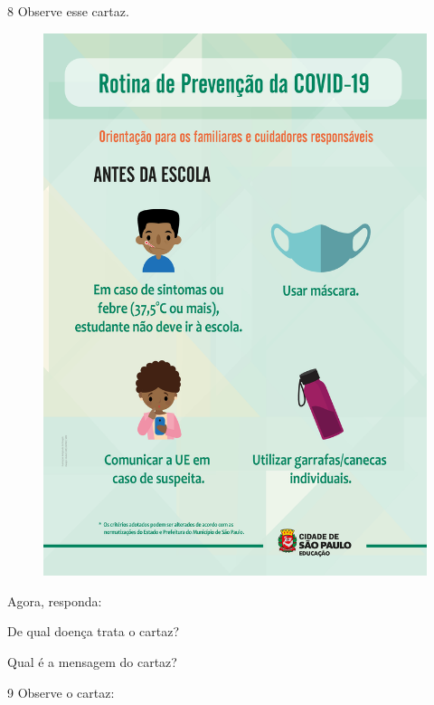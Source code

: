 \num{8} Observe esse cartaz.


\begin{figure}[H]
\centering
\includegraphics[width=.8\textwidth]{media/image192.jpg}
\end{figure}


Agora, responda:

\begin{escolha}
\item De qual doença trata o cartaz?


\item Qual é a mensagem do cartaz?

\end{escolha}

\num{9} Observe o cartaz:

